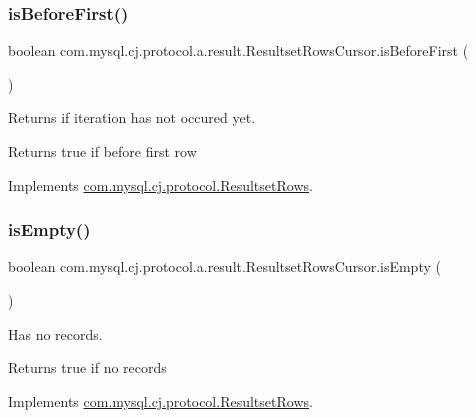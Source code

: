 \subsubsection{\texorpdfstring{is\+Before\+First()}{isBeforeFirst()}}
{\footnotesize\ttfamily boolean com.\+mysql.\+cj.\+protocol.\+a.\+result.\+Resultset\+Rows\+Cursor.\+is\+Before\+First (\begin{DoxyParamCaption}{ }\end{DoxyParamCaption})}

Returns if iteration has not occured yet.

\begin{DoxyReturn}{Returns}
true if before first row 
\end{DoxyReturn}


Implements \mbox{\hyperlink{interfacecom_1_1mysql_1_1cj_1_1protocol_1_1_resultset_rows_a748205e182d8b1b1263ebe78c7062517}{com.\+mysql.\+cj.\+protocol.\+Resultset\+Rows}}.

\mbox{\label{classcom_1_1mysql_1_1cj_1_1protocol_1_1a_1_1result_1_1_resultset_rows_cursor_a3fcb0eaca47918a78033b083af35b02a}} 
\subsubsection{\texorpdfstring{is\+Empty()}{isEmpty()}}
{\footnotesize\ttfamily boolean com.\+mysql.\+cj.\+protocol.\+a.\+result.\+Resultset\+Rows\+Cursor.\+is\+Empty (\begin{DoxyParamCaption}{ }\end{DoxyParamCaption})}

Has no records.

\begin{DoxyReturn}{Returns}
true if no records 
\end{DoxyReturn}


Implements \mbox{\hyperlink{interfacecom_1_1mysql_1_1cj_1_1protocol_1_1_resultset_rows_ae130183c4bba57a93d3fe890f14b6c25}{com.\+mysql.\+cj.\+protocol.\+Resultset\+Rows}}.

\mbox{\label{classcom_1_1mysql_1_1cj_1_1protocol_1_1a_1_1result_1_1_resultset_rows_cursor_a8d0ae8e04f7731f461437563ea13c6b9}} 
